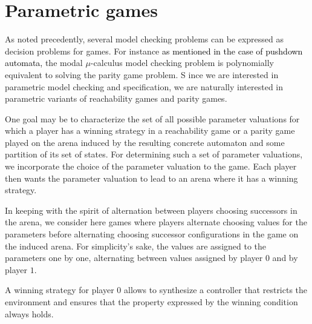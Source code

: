 \section{Parametric games}

As noted precedently, 
several model checking problems can be
expressed as decision problems for games.
For instance 
\textcolor{black}{
as mentioned 
in the case of pushdown automata, 
}
the modal $\mu$-calculus
model checking problem is polynomially equivalent to solving the parity game problem.
S%
ince we are interested in parametric model checking and specification,
we are naturally interested in parametric variants of reachability games and parity games.


One goal may be to characterize the set of all possible parameter valuations for which a player has a winning strategy in a 
reachability game or a parity game
played on the arena induced by the
resulting concrete automaton
and some partition of its set of states. 
For determining such a set of parameter valuations, we incorporate the choice of the parameter valuation to the game. Each player then wants the parameter valuation to lead to an arena where it has a winning strategy.

In keeping with the spirit of alternation between players choosing successors in the arena, we consider here games where players
alternate choosing values for the parameters before alternating choosing successor configurations in the game on the induced arena.
For simplicity's sake, the values are assigned to the parameters one by one, alternating between values assigned by player $0$ and by player $1$.

A winning strategy for player $0$ allows to synthesize a controller that restricts the environment and ensures that {the property expressed by the winning condition always holds.}

